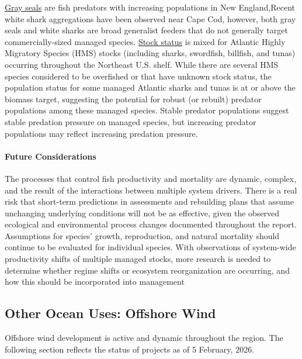 \documentclass[
  10pt,
]{article}
\begin{document}
\href{https://noaa-edab.github.io/catalog/grayseal.html}{Gray seals} are fish predators with increasing populations in New England,Recent white shark aggregations have been observed near Cape Cod, however, both gray seals and white sharks are broad generalist feeders that do not generally target commercially-sized managed species. \href{https://noaa-edab.github.io/catalog/hms_stock_status.html}{Stock status} is mixed for Atlantic Highly Migratory Species (HMS) stocks (including sharks, swordfish, billfish, and tunas) occurring throughout the Northeast U.S. shelf. While there are several HMS species considered to be overfished or that have unknown stock status, the population status for some managed Atlantic sharks and tunas is at or above the biomass target, suggesting the potential for robust (or rebuilt) predator populations among these managed species. Stable predator populations suggest stable predation pressure on managed species, but increasing predator populations may reflect increasing predation pressure.

\paragraph{Future Considerations}\label{future-considerations-2}

The processes that control fish productivity and mortality are dynamic, complex, and the result of the interactions between multiple system drivers. There is a real risk that short-term predictions in assessments and rebuilding plans that assume unchanging underlying conditions will not be as effective, given the observed ecological and environmental process changes documented throughout the report. Assumptions for species' growth, reproduction, and natural mortality should continue to be evaluated for individual species. With observations of system-wide productivity shifts of multiple managed stocks, more research is needed to determine whether regime shifts or ecosystem reorganization are occurring, and how this should be incorporated into management

\subsection{Other Ocean Uses: Offshore Wind}\label{other-ocean-uses-offshore-wind}

Offshore wind development is active and dynamic throughout the region. The following section reflects the status of projects as of 5 February, 2026.
\end{document}
